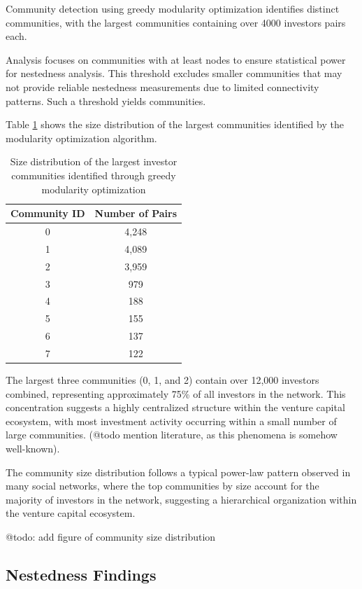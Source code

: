 \documentclass[12pt]{article}
\begin{document}
Community detection using greedy modularity optimization identifies \numCommunities{} distinct communities, with the largest communities containing over 4000 investors pairs each.

Analysis focuses on communities with at least \numCommunitiesThreshold{} nodes to ensure statistical power for nestedness analysis. This threshold excludes smaller communities that may not provide reliable nestedness measurements due to limited connectivity patterns. Such a threshold yields \numTopCommunities{} communities.

Table \ref{tab:community_sizes} shows the size distribution of the largest communities identified by the modularity optimization algorithm.

\begin{table}[h]
\centering
\begin{tabular}{|c|c|}
\hline
\textbf{Community ID} & \textbf{Number of Pairs} \\
\hline
0 & 4,248 \\
1 & 4,089 \\
2 & 3,959 \\
3 & 979 \\
4 & 188 \\
5 & 155 \\
6 & 137 \\
7 & 122 \\
\hline
\end{tabular}
\caption{Size distribution of the largest investor communities identified through greedy modularity optimization}
\label{tab:community_sizes}
\end{table}

The largest three communities (0, 1, and 2) contain over 12,000 investors combined, representing approximately 75\% of all investors in the network. This concentration suggests a highly centralized structure within the venture capital ecosystem, with most investment activity occurring within a small number of large communities. (@todo mention literature, as this phenomena is somehow well-known).

The community size distribution follows a typical power-law pattern observed in many social networks, where the top \numTopCommunities{} communities by size account for the majority of investors in the network, suggesting a hierarchical organization within the venture capital ecosystem.

@todo: add figure of community size distribution

\subsection{Nestedness Findings}
\end{document}
